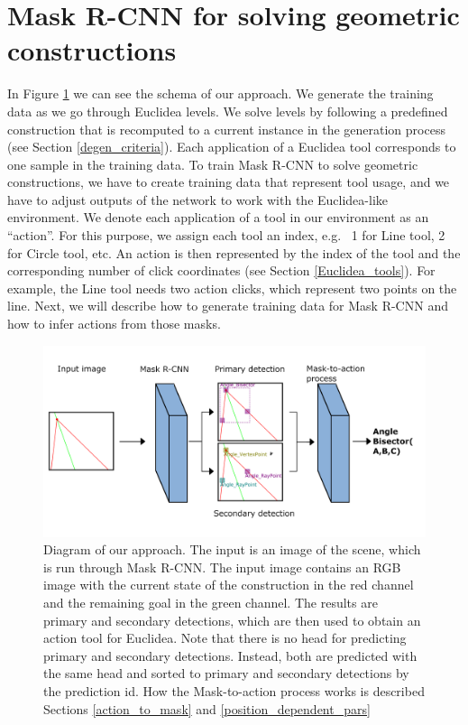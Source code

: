 \section{ Mask R-CNN for solving geometric constructions}
In Figure \ref{our_approach_schema} we can see the schema of our approach. We generate the training data as we go through Euclidea levels. We solve levels by following a predefined construction that is recomputed to a current instance in the generation process (see Section \ref{degen_criteria}). Each application of a Euclidea tool corresponds to one sample in the training data. To train Mask {R-CNN} to solve geometric constructions, we have to create training data that represent tool usage, and we have to adjust outputs of the network to work with the Euclidea-like environment. 
\newline \newline
We denote each application of a tool in our environment as an ``action''. For this purpose, we assign each tool an index, e.g.~ 1 for Line tool, 2 for Circle tool, etc. An action is then represented by the index of the tool and the corresponding number of click coordinates (see Section \ref{Euclidea_tools}). For example, the Line tool needs two action clicks, which represent two points on the line. Next, we will describe how to generate training data for Mask {R-CNN} and how to infer actions from those masks. 
\begin{figure}[h]
\centering
\includegraphics[width=140mm]{img/approach_schema.png}
\caption{Diagram of our approach. The input is an image of the scene, which is run through Mask {R-CNN}. The input image contains an RGB image with the current state of the construction in the red channel and the remaining goal in the green channel. The results are primary and secondary detections, which are then used to obtain an action tool for Euclidea. Note that there is no head for predicting primary and secondary detections. Instead, both are predicted with the same head and sorted to primary and secondary detections by the prediction id. How the Mask-to-action process works is described Sections \ref{action_to_mask} and \ref{position_dependent_pars}}
\label{our_approach_schema}

\end{figure}
